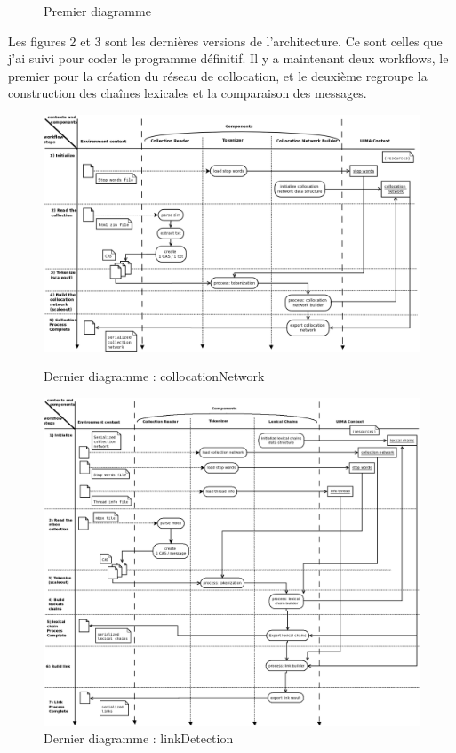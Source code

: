 \documentclass[a4paper]{article}
\begin{document}
\begin{figure}[!]
  	\caption{Premier diagramme}
	\end{figure}
		
Les figures 2 et 3 sont les dernières versions de l'architecture. Ce sont celles que j'ai suivi pour coder le programme définitif. Il y a maintenant deux workflows, le premier pour la création du réseau de collocation, et le deuxième regroupe la construction des chaînes lexicales et la comparaison des messages.
	
	\begin{figure}[!]
  	\centering
  	\includegraphics[width=1\textwidth]{Figures/cn.png}
  	\caption{Dernier diagramme : collocationNetwork}
  	\includegraphics[width=1\textwidth]{Figures/mondiagramme.png}
  	\caption{Dernier diagramme : linkDetection}
	\end{figure}
	
\end{document}

